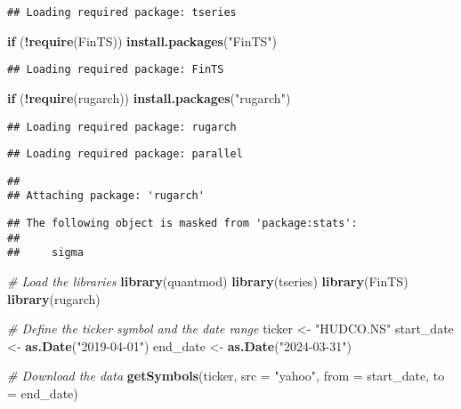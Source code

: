 \documentclass[
]{article}
\newenvironment{Shaded}{\begin{snugshade}}{\end{snugshade}}
\newcommand{\AttributeTok}[1]{\textcolor[rgb]{0.13,0.29,0.53}{#1}}
\newcommand{\CommentTok}[1]{\textcolor[rgb]{0.56,0.35,0.01}{\textit{#1}}}
\newcommand{\ControlFlowTok}[1]{\textcolor[rgb]{0.13,0.29,0.53}{\textbf{#1}}}
\newcommand{\FunctionTok}[1]{\textcolor[rgb]{0.13,0.29,0.53}{\textbf{#1}}}
\newcommand{\NormalTok}[1]{#1}
\newcommand{\OtherTok}[1]{\textcolor[rgb]{0.56,0.35,0.01}{#1}}
\newcommand{\SpecialCharTok}[1]{\textcolor[rgb]{0.81,0.36,0.00}{\textbf{#1}}}
\newcommand{\StringTok}[1]{\textcolor[rgb]{0.31,0.60,0.02}{#1}}
\begin{document}
\begin{verbatim}
## Loading required package: tseries
\end{verbatim}

\begin{Shaded}
\begin{Highlighting}[]
\ControlFlowTok{if}\NormalTok{ (}\SpecialCharTok{!}\FunctionTok{require}\NormalTok{(FinTS)) }\FunctionTok{install.packages}\NormalTok{(}\StringTok{"FinTS"}\NormalTok{)}
\end{Highlighting}
\end{Shaded}

\begin{verbatim}
## Loading required package: FinTS
\end{verbatim}

\begin{Shaded}
\begin{Highlighting}[]
\ControlFlowTok{if}\NormalTok{ (}\SpecialCharTok{!}\FunctionTok{require}\NormalTok{(rugarch)) }\FunctionTok{install.packages}\NormalTok{(}\StringTok{"rugarch"}\NormalTok{)}
\end{Highlighting}
\end{Shaded}

\begin{verbatim}
## Loading required package: rugarch
\end{verbatim}

\begin{verbatim}
## Loading required package: parallel
\end{verbatim}

\begin{verbatim}
## 
## Attaching package: 'rugarch'
\end{verbatim}

\begin{verbatim}
## The following object is masked from 'package:stats':
## 
##     sigma
\end{verbatim}

\begin{Shaded}
\begin{Highlighting}[]
\CommentTok{\# Load the libraries}
\FunctionTok{library}\NormalTok{(quantmod)}
\FunctionTok{library}\NormalTok{(tseries)}
\FunctionTok{library}\NormalTok{(FinTS)}
\FunctionTok{library}\NormalTok{(rugarch)}

\CommentTok{\# Define the ticker symbol and the date range}
\NormalTok{ticker }\OtherTok{\textless{}{-}} \StringTok{"HUDCO.NS"}
\NormalTok{start\_date }\OtherTok{\textless{}{-}} \FunctionTok{as.Date}\NormalTok{(}\StringTok{"2019{-}04{-}01"}\NormalTok{)}
\NormalTok{end\_date }\OtherTok{\textless{}{-}} \FunctionTok{as.Date}\NormalTok{(}\StringTok{"2024{-}03{-}31"}\NormalTok{)}

\CommentTok{\# Download the data}
\FunctionTok{getSymbols}\NormalTok{(ticker, }\AttributeTok{src =} \StringTok{"yahoo"}\NormalTok{, }\AttributeTok{from =}\NormalTok{ start\_date, }\AttributeTok{to =}\NormalTok{ end\_date)}
\end{Highlighting}
\end{Shaded}
\end{document}
